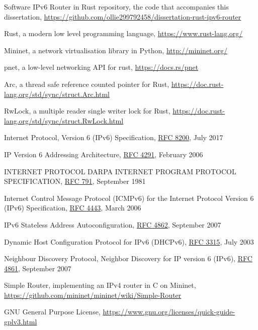 \documentclass[12pt,a4paper,twoside,openright]{report}
\begin{document}
\begin{thebibliography}{1}

 Software IPv6 Router in Rust repository, the code that accompanies this dissertation, \url{https://github.com/ollie299792458/dissertation-rust-ipv6-router}

 Rust, a modern low level programming language, \url{https://www.rust-lang.org/}

 Mininet, a network virtualisation library in Python, \url{http://mininet.org/}

 pnet, a low-level networking API for rust, \url{https://docs.rs/pnet}

 Arc, a thread safe reference counted pointer for Rust, \url{https://doc.rust-lang.org/std/sync/struct.Arc.html}

RwLock, a multiple reader single writer lock for Rust, \url{https://doc.rust-lang.org/std/sync/struct.RwLock.html}

 Internet Protocol, Version 6 (IPv6) Specification, \href{https://tools.ietf.org/html/rfc8200}{RFC 8200}, July 2017

 IP Version 6 Addressing Architecture, \href{https://tools.ietf.org/html/rfc4291}{RFC 4291}, February 2006

 INTERNET PROTOCOL DARPA INTERNET PROGRAM PROTOCOL SPECIFICATION, \href{https://tools.ietf.org/html/rfc791}{RFC 791}, September 1981

 Internet Control Message Protocol (ICMPv6) for the Internet Protocol Version 6 (IPv6) Specification, \href{https://tools.ietf.org/html/rfc4443}{RFC 4443}, March 2006

 IPv6 Stateless Address Autoconfiguration, \href{https://tools.ietf.org/html/rfc4862}{RFC 4862}, September 2007

 Dynamic Host Configuration Protocol for IPv6 (DHCPv6), \href{https://tools.ietf.org/html/rfc3315}{RFC 3315}, July 2003

 Neighbour Discovery Protocol, Neighbor Discovery for IP version 6 (IPv6), \href{https://tools.ietf.org/html/rfc4861}{RFC 4861}, September 2007

 Simple Router, implementing an IPv4 router in C on Mininet, \url{https://github.com/mininet/mininet/wiki/Simple-Router}

 GNU General Purpose License, \url{https://www.gnu.org/licenses/quick-guide-gplv3.html}

\end{thebibliography}
\end{document}

